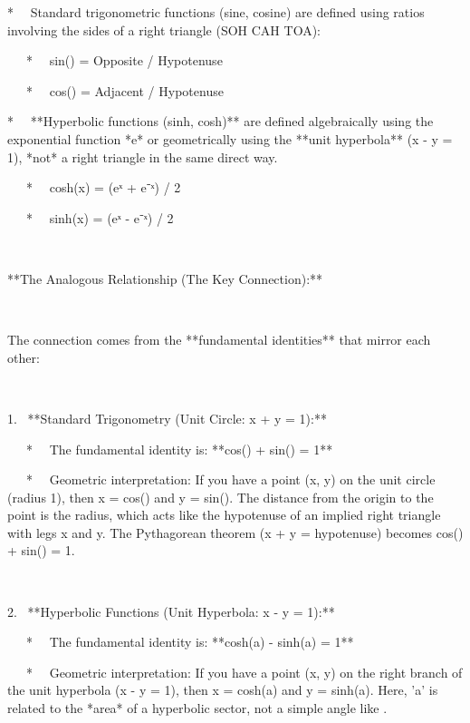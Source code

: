 \documentclass{article}
\begin{document}
* \ \ Standard trigonometric functions (sine, cosine) are defined using ratios
involving the sides of a right triangle (SOH CAH TOA):

\ \ \ * \ \ sin({\theta}) = Opposite / Hypotenuse

\ \ \ * \ \ cos({\theta}) = Adjacent / Hypotenuse

* \ \ **Hyperbolic functions (sinh, cosh)** are defined algebraically using
the exponential function *e* or geometrically using the **unit hyperbola**
(x{\texttwosuperior} - y{\texttwosuperior} = 1), *not* a right triangle in the
same direct way.

\ \ \ * \ \ cosh(x) = (eˣ + e⁻ˣ) / 2

\ \ \ * \ \ sinh(x) = (eˣ - e⁻ˣ) / 2

\

**The Analogous Relationship (The Key Connection):**

\

The connection comes from the **fundamental identities** that mirror each
other:

\

1. \ **Standard Trigonometry (Unit Circle: x{\texttwosuperior} +
y{\texttwosuperior} = 1):**

\ \ \ * \ \ The fundamental identity is: **cos{\texttwosuperior}({\theta}) +
sin{\texttwosuperior}({\theta}) = 1**

\ \ \ * \ \ Geometric interpretation: If you have a point (x, y) on the unit
circle (radius 1), then x = cos({\theta}) and y = sin({\theta}). The distance
from the origin to the point is the radius, which acts like the hypotenuse of
an implied right triangle with legs x and y. The Pythagorean theorem
(x{\texttwosuperior} + y{\texttwosuperior} = hypotenuse{\texttwosuperior})
becomes cos{\texttwosuperior}({\theta}) + sin{\texttwosuperior}({\theta}) =
1{\texttwosuperior}.

\

2. \ **Hyperbolic Functions (Unit Hyperbola: x{\texttwosuperior} -
y{\texttwosuperior} = 1):**

\ \ \ * \ \ The fundamental identity is: **cosh{\texttwosuperior}(a) -
sinh{\texttwosuperior}(a) = 1**

\ \ \ * \ \ Geometric interpretation: If you have a point (x, y) on the right
branch of the unit hyperbola (x{\texttwosuperior} - y{\texttwosuperior} = 1),
then x = cosh(a) and y = sinh(a). Here, 'a' is related to the *area* of a
hyperbolic sector, not a simple angle like {\theta}.

\
\end{document}

